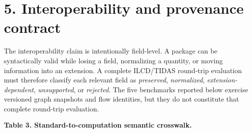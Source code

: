 \documentclass[
  10pt,
  a4paper,
  DIV=11,
  numbers=noendperiod]{scrartcl}
\begin{document}
\section{5. Interoperability and provenance
contract}\label{interoperability-and-provenance-contract}

The interoperability claim is intentionally field-level. A package can
be syntactically valid while losing a field, normalizing a quantity, or
moving information into an extension. A complete ILCD/TIDAS round-trip
evaluation must therefore classify each relevant field as
\emph{preserved}, \emph{normalized}, \emph{extension-dependent},
\emph{unsupported}, or \emph{rejected}. The five benchmarks reported
below exercise versioned graph snapshots and flow identities, but they
do not constitute that complete round-trip evaluation.

\textbf{Table 3. Standard-to-computation semantic crosswalk.}
\end{document}
